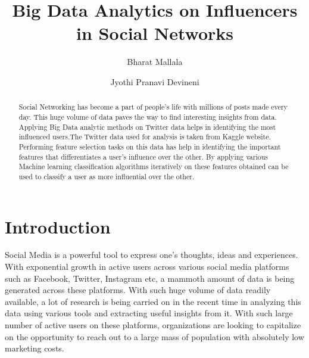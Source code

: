 \documentclass[sigconf]{acmart}
\begin{document}
\title{Big Data Analytics on Influencers in Social Networks}



\author{Bharat Mallala}

\author{Jyothi Pranavi Devineni}




\begin{abstract}
Social Networking has become a part of people's life with millions
of posts made every day. This huge volume of data paves the way to find interesting insights from data. Applying Big Data analytic methods  on Twitter data helps in identifying the most influenced users.The Twitter data used for analysis is taken from Kaggle website. Performing feature selection tasks on this data has help in identifying the important features that differentiates a user's influence over the other. By applying various Machine learning classification algorithms iteratively on these features obtained can be used to classify a user as more influential over the other. 

\end{abstract}

\maketitle
\section{Introduction}
Social Media is a powerful tool to express one's thoughts, ideas and experiences. With exponential growth in active users across various social media platforms such as Facebook, Twitter, Instagram etc, a mammoth amount of data is being generated across these platforms. With such huge volume of data readily available, a lot of research is being carried on in the recent time in analyzing this data using various tools and extracting useful insights from it. With such large number of active users on these platforms, organizations are looking to capitalize on the opportunity to reach out to a large mass of population with absolutely low marketing costs.
\end{document}
